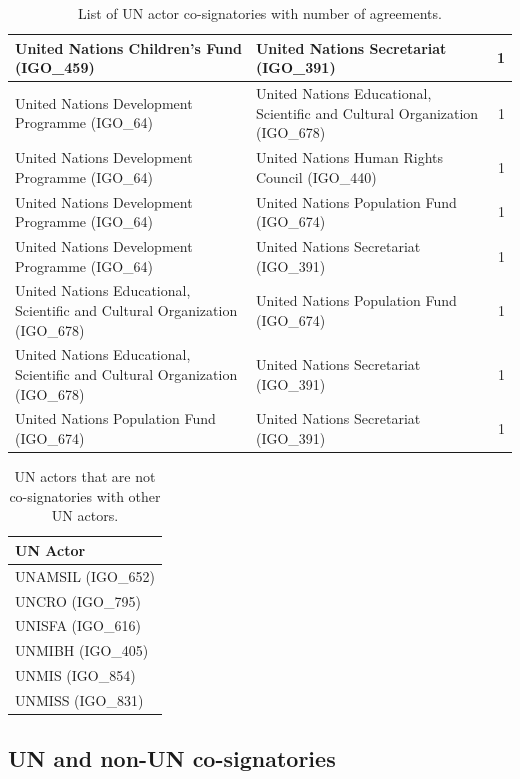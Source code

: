 \documentclass{article}
\begin{document}
\begin{table}[H]
\begin{center}
\begin{tabularx}{\textwidth}{|X|X|r|}
United Nations Children's Fund (IGO\_459) & United Nations Secretariat (IGO\_391) & 1 \\
\hline
United Nations Development Programme (IGO\_64) & United Nations Educational, Scientific and Cultural Organization (IGO\_678) & 1 \\
\hline
United Nations Development Programme (IGO\_64) & United Nations Human Rights Council (IGO\_440) & 1 \\
\hline
United Nations Development Programme (IGO\_64) & United Nations Population Fund (IGO\_674) & 1 \\
\hline
United Nations Development Programme (IGO\_64) & United Nations Secretariat (IGO\_391) & 1 \\
\hline
United Nations Educational, Scientific and Cultural Organization (IGO\_678) & United Nations Population Fund (IGO\_674) & 1 \\
\hline
United Nations Educational, Scientific and Cultural Organization (IGO\_678) & United Nations Secretariat (IGO\_391) & 1 \\
\hline
United Nations Population Fund (IGO\_674) & United Nations Secretariat (IGO\_391) & 1 \\
\hline
\end{tabularx}
\end{center}
\normalsize
\caption{List of UN actor co-signatories with number of agreements.}
\end{table}

\begin{table}[H]
\begin{center}
\small
\begin{tabularx}{\textwidth}{|X|}
    \hline
    \textbf{UN Actor} \\
    \hline
UNAMSIL (IGO\_652) \\
\hline
UNCRO (IGO\_795) \\
\hline
UNISFA (IGO\_616) \\
\hline
UNMIBH (IGO\_405) \\
\hline
UNMIS (IGO\_854) \\
\hline
UNMISS (IGO\_831) \\
\hline
\end{tabularx}
\end{center}
\normalsize
\caption{UN actors that are not co-signatories with other UN actors.}
\end{table}


\subsection{UN and non-UN co-signatories}
\end{document}
